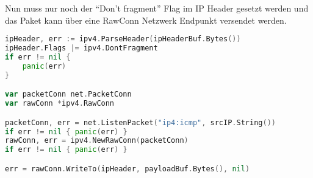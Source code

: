 Nun muss nur noch der \enquote{Don't fragment} Flag im IP Header gesetzt werden und das Paket kann über eine RawConn Netzwerk Endpunkt versendet werden.

\begin{lstlisting}[language=go, caption=Don't fragment setzen und Paket verschicken] 
ipHeader, err := ipv4.ParseHeader(ipHeaderBuf.Bytes())
ipHeader.Flags |= ipv4.DontFragment
if err != nil {
	panic(err)
}

var packetConn net.PacketConn
var rawConn *ipv4.RawConn

packetConn, err = net.ListenPacket("ip4:icmp", srcIP.String())
if err != nil { panic(err) }
rawConn, err = ipv4.NewRawConn(packetConn)
if err != nil { panic(err) }

err = rawConn.WriteTo(ipHeader, payloadBuf.Bytes(), nil)
\end{lstlisting}